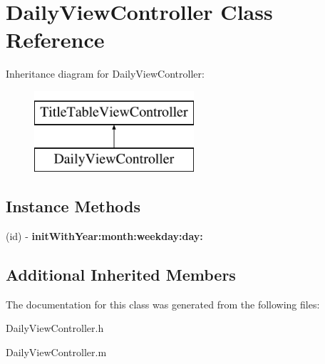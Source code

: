 \hypertarget{interface_daily_view_controller}{\section{Daily\+View\+Controller Class Reference}
\label{interface_daily_view_controller}
}
Inheritance diagram for Daily\+View\+Controller\+:\begin{figure}[H]
\begin{center}
\leavevmode
\includegraphics[height=3.000000cm]{interface_daily_view_controller}
\end{center}
\end{figure}
\subsection*{Instance Methods}
\begin{DoxyCompactItemize}
\item 
\hypertarget{interface_daily_view_controller_a878944aa1f745382d93c4dce2f22b431}{(id) -\/ {\bfseries init\+With\+Year\+:month\+:weekday\+:day\+:}}\label{interface_daily_view_controller_a878944aa1f745382d93c4dce2f22b431}

\end{DoxyCompactItemize}
\subsection*{Additional Inherited Members}


The documentation for this class was generated from the following files\+:\begin{DoxyCompactItemize}
\item 
Daily\+View\+Controller.\+h\item 
Daily\+View\+Controller.\+m\end{DoxyCompactItemize}
